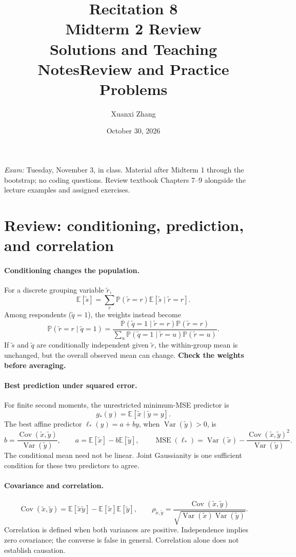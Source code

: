\documentclass[11pt]{article}
\title{\huge Recitation 8\\[0.35em]\normalsize Midterm 2 Review\\[0.35em]
 \large\ifsolutions Solutions and Teaching Notes\else Review and Practice Problems\fi}
\author{Xuanxi Zhang}
\date{October 30, 2026}
\newcommand{\rv}[1]{\widetilde{#1}}
\newcommand{\E}{\mathbb E}
\newcommand{\Pbb}{\mathbb P}
\newcommand{\Var}{\operatorname{Var}}
\newcommand{\Cov}{\operatorname{Cov}}
\newcommand{\MSE}{\operatorname{MSE}}
\begin{document}
\maketitle
\noindent\textit{Exam:} Tuesday, November 3, in class. Material after Midterm 1
through the bootstrap; no coding questions. Review textbook Chapters 7--9
alongside the lecture examples and assigned exercises.

\section*{Review: conditioning, prediction, and correlation}
\paragraph{Conditioning changes the population.}
For a discrete grouping variable $\rv{r}$,
\[
 \E[\rv{s}]=\sum_r\Pbb(\rv r=r)\E[\rv s\mid\rv r=r].
\]
Among respondents ($\rv q=1$), the weights instead become
\[
 \Pbb(\rv r=r\mid\rv q=1)
 =\frac{\Pbb(\rv q=1\mid\rv r=r)\Pbb(\rv r=r)}
 {\sum_u\Pbb(\rv q=1\mid\rv r=u)\Pbb(\rv r=u)}.
\]
If $\rv s$ and $\rv q$ are conditionally independent given $\rv r$,
the within-group mean is unchanged, but the overall observed mean can change.
\textbf{Check the weights before averaging.}

\paragraph{Best prediction under squared error.}
For finite second moments, the unrestricted minimum-MSE predictor is
\[
 g_*(y)=\E[\rv x\mid\rv y=y].
\]
The best affine predictor $\ell_*(y)=a+by$, when $\Var(\rv y)>0$, is
\[
 b=\frac{\Cov(\rv x,\rv y)}{\Var(\rv y)},\qquad
 a=\E[\rv x]-b\E[\rv y],\qquad
 \MSE(\ell_*)=\Var(\rv x)-\frac{\Cov(\rv x,\rv y)^2}{\Var(\rv y)}.
\]
The conditional mean need not be linear. Joint Gaussianity is one sufficient
condition for these two predictors to agree.

\paragraph{Covariance and correlation.}
\[
 \Cov(\rv x,\rv y)=\E[\rv x\rv y]-\E[\rv x]\E[\rv y],\qquad
 \rho_{\rv x,\rv y}=\frac{\Cov(\rv x,\rv y)}
 {\sqrt{\Var(\rv x)\Var(\rv y)}}.
\]
Correlation is defined when both variances are positive. Independence implies
zero covariance; the converse is false in general. Correlation alone does not
establish causation.
\end{document}
